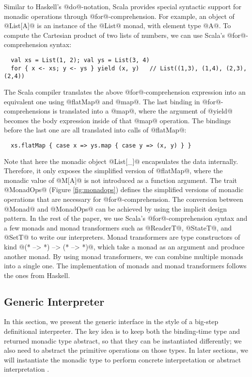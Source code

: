 Similar to Haskell's @do@-notation, Scala provides special syntactic support
for monadic operations through @for@-comprehension.  For example, an object of
@List[A]@ is an instance of the @List@ monad, with element type @A@.
To compute the Cartesian product of two lists of numbers, we can use Scala's
@for@-comprehension syntax:
\begin{lstlisting}
  val xs = List(1, 2); val ys = List(3, 4)
  for { x <- xs; y <- ys } yield (x, y)   // List((1,3), (1,4), (2,3), (2,4))
\end{lstlisting}

The Scala compiler translates the above @for@-comprehension expression into
an equivalent one using @flatMap@ and @map@. The last binding
in @for@-comprehensions is translated into a @map@, where the argument of
@yield@ becomes the body expression inside of that @map@ operation. The
bindings before the last one are all translated into calls of @flatMap@:
\begin{lstlisting}
  xs.flatMap { case x => ys.map { case y => (x, y) } }
\end{lstlisting}

Note that here the monadic object @List[_]@ encapsulates the data internally.
Therefore, it only exposes the simplified version of @flatMap@, where the monadic
value of @M[A]@ is not introduced as a function argument. The trait @MonadOps@ (Figure
\ref{fig:monadops}) defines the simplified versions of monadic operations that
are necessary for @for@-comprehension. The conversion between @Monad@ and
@MonadOps@ can be achieved by using the implicit design pattern.
In the rest of the paper, we use Scala's @for@-comprehension syntax and a few
monads and monad transformers such as @ReaderT@, @StateT@, and @SetT@ to
write our interpreters.
Monad transformers are type constructors of kind @(* --> *) --> (* --> *)@, which
take a monad as an argument and produce another monad. By using monad
transformers, we can combine multiple monads into a single one.  The
implementation of monads and monad transformers follows the ones from Haskell.

\subsection{Generic Interpreter} \label{generic_if}

In this section, we present the generic interface in the style of a big-step
definitional interpreter. The key idea is to keep both the binding-time type and
returned monadic type abstract, so that they can be instantiated
differently; we also need to abstract the primitive operations on those types.
In later sections, we will instantiate the monadic type to perform concrete
interpretation \citet{DBLP:conf/popl/LiangHJ95} or abstract interpretation
\cite{Sergey:2013:MAI:2491956.2491979, DBLP:journals/pacmpl/DaraisLNH17}.


